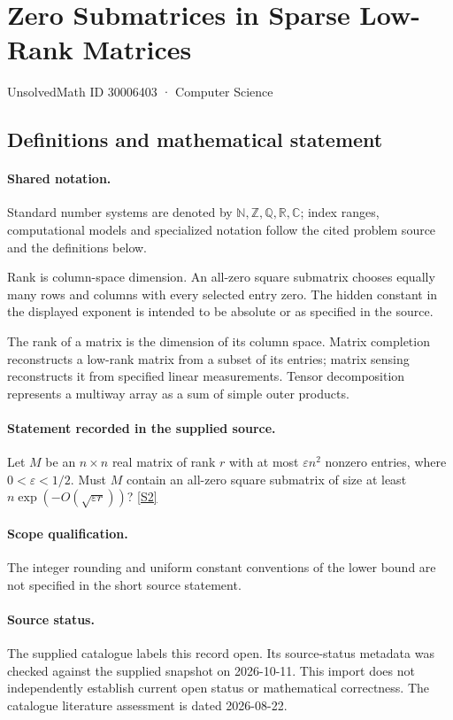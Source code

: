 \documentclass[11pt]{article}
\newcommand{\sref}[2]{\hyperlink{source:#1:#2}{[S#2]}}
\begin{document}
\setcounter{section}{30006402}
\section{Zero Submatrices in Sparse Low-Rank Matrices}\label{30006403}
{\small\sffamily UnsolvedMath ID 30006403 · Computer Science}
\subsection{Definitions and mathematical statement}

\paragraph{Shared notation.}Standard number systems are denoted by $\mathbb N,\mathbb Z,\mathbb Q,\mathbb R,\mathbb C$; index ranges, computational models and specialized notation follow the cited problem source and the definitions below.


Rank is column-space dimension. An all-zero square submatrix chooses equally many rows and columns with every selected entry zero. The hidden constant in the displayed exponent is intended to be absolute or as specified in the source.

The rank of a matrix is the dimension of its column space. Matrix completion reconstructs a low-rank matrix from a subset of its entries; matrix sensing reconstructs it from specified linear measurements. Tensor decomposition represents a multiway array as a sum of simple outer products.
\paragraph{Statement recorded in the supplied source.}
Let $M$ be an $n\times n$ real matrix of rank $r$ with at most $\varepsilon n^2$ nonzero entries, where $0<\varepsilon<1/2$. Must $M$ contain an all-zero square submatrix of size at least $n\exp\!\left(-O(\sqrt{\varepsilon r})\right)$? \sref{30006403}{2}
\paragraph{Scope qualification.}
The integer rounding and uniform constant conventions of the lower bound are not specified in the short source statement.
\paragraph{Source status.}
The supplied catalogue labels this record open. Its source-status metadata was checked against the supplied snapshot on 2026-10-11. This import does not independently establish current open status or mathematical correctness. The catalogue literature assessment is dated 2026-08-22.
\end{document}
